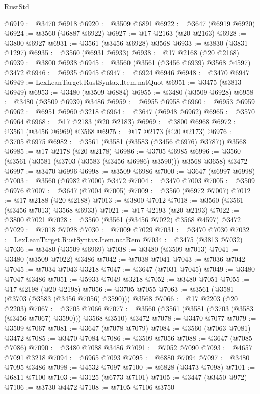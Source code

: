 \begin{lexlean}{RustStd}
\begin{coremodule}
@6919 := @3470 @6918
@6920 := @3509 @6891
@6922 := @3647 (@6919 @6920)
@6924 := @3560 (@6887 @6922)
@6927 := @17 @2163 (@20 @2163)
@6928 := @3800 @6927
@6931 := @3561 (@3456 @6928) @3568
@6933 := @3830 (@3831 @1297)
@6935 := @3560 (@6931 @6933)
@6938 := @17 @2168 (@20 @2168)
@6939 := @3800 @6938
@6945 := @3560 (@3561 (@3456 @6939) @3568 @4597) @3472
@6946 := @6935 @6945
@6947 := @6924 @6946
@6948 := @3470 @6947
@6949 := LexLeanTarget.RustSyntax.Item.natQuot
@6951 := @3475 (@3813 @6949)
@6953 := @3480 (@3509 @6884)
@6955 := @3480 (@3509 @6928)
@6958 := @3480 (@3509 @6939) @3486
@6959 := @6955 @6958
@6960 := @6953 @6959
@6962 := @6951 @6960 @3218
@6964 := @3647 (@6948 @6962)
@6965 := @3570 @6964
@6968 := @17 @2183 (@20 @2183)
@6969 := @3800 @6968
@6972 := @3561 (@3456 @6969) @3568
@6975 := @17 @2173 (@20 @2173)
@6976 := @3705 @6975
@6982 := @3561 (@3581 (@3583 (@3456 @6976) @3787)) @3568
@6985 := @17 @2178 (@20 @2178)
@6986 := @3705 @6985
@6996 := @3560 (@3561 (@3581 (@3703 (@3583 (@3456 @6986) @3590))) @3568 @3658) @3472
@6997 := @3470 @6996
@6998 := @3509 @6986
@7000 := @3647 (@6997 @6998)
@7003 := @3560 (@6982 @7000) @3472
@7004 := @3470 @7003
@7005 := @3509 @6976
@7007 := @3647 (@7004 @7005)
@7009 := @3560 (@6972 @7007)
@7012 := @17 @2188 (@20 @2188)
@7013 := @3800 @7012
@7018 := @3560 (@3561 (@3456 @7013) @3568 @6933)
@7021 := @17 @2193 (@20 @2193)
@7022 := @3800 @7021
@7028 := @3560 (@3561 (@3456 @7022) @3568 @4597) @3472
@7029 := @7018 @7028
@7030 := @7009 @7029
@7031 := @3470 @7030
@7032 := LexLeanTarget.RustSyntax.Item.natRem
@7034 := @3475 (@3813 @7032)
@7036 := @3480 (@3509 @6969)
@7038 := @3480 (@3509 @7013)
@7041 := @3480 (@3509 @7022) @3486
@7042 := @7038 @7041
@7043 := @7036 @7042
@7045 := @7034 @7043 @3218
@7047 := @3647 (@7031 @7045)
@7049 := @3480 @7047 @3486
@7051 := @5933 @7049 @3218
@7052 := @3480 @7051
@7055 := @17 @2198 (@20 @2198)
@7056 := @3705 @7055
@7063 := @3561 (@3581 (@3703 (@3583 (@3456 @7056) @3590))) @3568
@7066 := @17 @2203 (@20 @2203)
@7067 := @3705 @7066
@7077 := @3560 (@3561 (@3581 (@3703 (@3583 (@3456 @7067) @3590))) @3568 @3510) @3472
@7078 := @3470 @7077
@7079 := @3509 @7067
@7081 := @3647 (@7078 @7079)
@7084 := @3560 (@7063 @7081) @3472
@7085 := @3470 @7084
@7086 := @3509 @7056
@7088 := @3647 (@7085 @7086)
@7090 := @3480 @7088 @3486
@7091 := @7052 @7090
@7093 := @4657 @7091 @3218
@7094 := @6965 @7093
@7095 := @6880 @7094
@7097 := @3480 @7095 @3486
@7098 := @4532 @7097
@7100 := @6828 (@3473 @7098)
@7101 := @6811 @7100
@7103 := @3125 (@6773 @7101)
@7105 := @3447 (@3450 @972)
@7106 := @3730 @4472
@7108 := @7105 @7106 @3750

\end{coremodule}
\end{lexlean}
